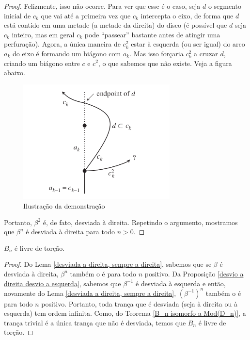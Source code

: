 \begin{proof}
		\par\vspace{0.3cm} Felizmente, isso não ocorre. Para ver que esse é o caso, seja $d$ o 
		segmento inicial de $c_k$ que vai até a primeira vez que $c_k$ intercepta o eixo, de forma 
		que $d$ está contido em uma metade (a metade da direita) do disco (é possível que $d$ seja 
		$c_k$ inteiro, mas em geral $c_k$ pode ``passear'' bastante antes de atingir uma perfuração). 
		Agora, a única maneira de $c_k^2$ estar à esquerda (ou ser igual) do arco $a_k$ do eixo é 
		formando um biágono com $a_k$. Mas isso forçaria $c_k^2$ a cruzar $d$, criando um biágono 
		entre $c$ e $c^2$, o que sabemos que não existe. Veja a figura abaixo.
		\begin{figure}[H]
		\begin{center}
			\includegraphics[width=8cm]{Images/demosntracao_lema.png}
		\end{center}\caption{Ilustração da demonstração}
		\label{ilustracao da demonstracao}
		\end{figure}
		Portanto, $\beta^2$ é, de fato, desviada à direita. Repetindo o argumento, mostramos que 
		$\beta^n$ é desviada à direita para todo $n>0$.
	\end{proof}
	\begin{corollary}
	\label{B_n livre de torcao por diagramas de curva}
		$B_n$ é livre de torção.
	\end{corollary}
	\begin{proof}
		Do Lema \ref{desviada a direita, sempre a direita}, sabemos que se $\beta$ é desviada à direita, 
		$\beta^n$ também o é para todo $n$ positivo. Da 
		Proposição \ref{desvio a direita desvio a esquerda}, sabemos que $\beta^{-1}$ é desviada 
		à esquerda e então, novamente do Lema \ref{desviada a direita, sempre a direita}, 
		$(\beta^{-1})^n$ também o é para todo $n$ positivo. Portanto, toda trança que é desviada 
		(seja à direita ou à esquerda) tem ordem infinita. Como, do 
		Teorema \ref{B_n isomorfo a Mod(D_n)}, a trança trivial é a única trança que não é desviada, 
		temos que $B_n$ é livre de torção.
	\end{proof}
